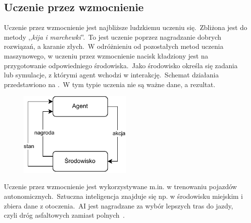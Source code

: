 \subsection{Uczenie przez wzmocnienie}
Uczenie przez wzmocnienie jest najbliższe ludzkiemu uczeniu się.\ Zbliżona jest do metody ,,\textit{kija i marchewki}''.\ To jest uczenie poprzez nagradzanie dobrych rozwiązań, a karanie złych.\ W odróżnieniu od pozostałych metod uczenia maszynowego, w uczeniu przez wzmocnienie nacisk kładziony jest na przygotowanie odpowiedniego środowiska.\ Jako środowisko określa się zadania lub symulacje, z którymi agent wchodzi w interakcję.\ Schemat działania przedstawiono na .\ W tym typie uczenia nie są ważne dane, a rezultat.

\begin{figure}[H]
    \centering
    \includegraphics[width=0.5\textwidth]{images/reinforcemen}
    \label{fig:reinforcemenet}
\end{figure}

Uczenie przez wzmocnienie jest wykorzystywane m.in. w trenowaniu pojazdów autonomicznych.\ Sztuczna inteligencja znajduje się np. w środowisku miejskim i zbiera dane z otoczenia.\ AI jest nagradzane za wybór lepszych tras do jazdy, czyli dróg asfaltowych zamiast polnych~\cite{AiScience, Mahesh2018}.


